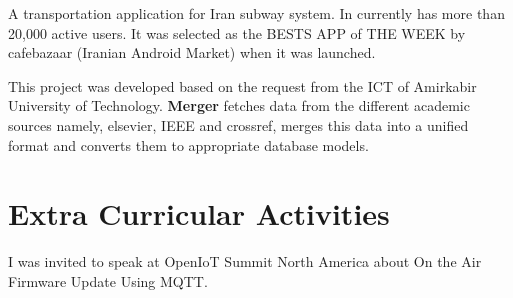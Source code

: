 \documentclass[]{deedy-resume-openfont}
\begin{document}
\begin{minipage}[t]{0.66\textwidth}

    A transportation application for Iran subway system. In currently
    has more than 20,000 active users. It was selected as the BESTS APP of THE
    WEEK by cafebazaar (Iranian Android Market) when it was launched.
\sectionsep

    This project was developed based on the request from the ICT of Amirkabir
    University of Technology. \textbf{Merger} fetches data from the different
    academic sources namely, elsevier, IEEE and crossref, merges this data
    into a unified format and converts them to appropriate database models.
\sectionsep




\section{Extra Curricular Activities}
I was invited to speak at OpenIoT Summit North America about On the Air Firmware
Update Using MQTT.


\end{minipage}
\end{document}
